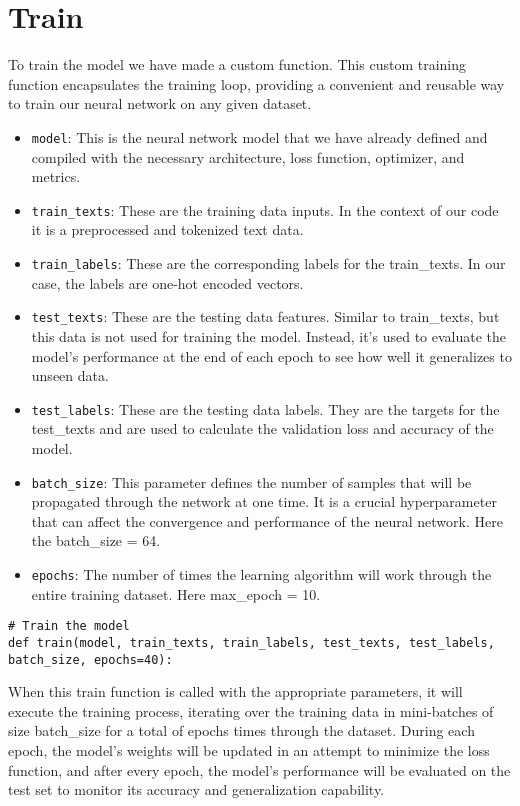 \section{Train}
To train the model we have made a custom function. This custom training function encapsulates the training loop, providing a convenient and reusable way to train our neural network on any given dataset.

\begin{itemize}
	\item \verb*|model|: This is the neural network model that we have already defined and compiled with the necessary architecture, loss function, optimizer, and metrics.
	
	\item \verb*|train_texts|: These are the training data inputs. In the context of our code it is a preprocessed and tokenized text data.
	
	\item \verb*|train_labels|: These are the corresponding labels for the train\_texts. In our case, the labels are one-hot encoded vectors.
	
	\item \verb*|test_texts|: These are the testing data features. Similar to train\_texts, but this data is not used for training the model. Instead, it's used to evaluate the model's performance at the end of each epoch to see how well it generalizes to unseen data.
	
	\item \verb*|test_labels|: These are the testing data labels. They are the targets for the test\_texts and are used to calculate the validation loss and accuracy of the model.
	
	\item \verb*|batch_size|: This parameter defines the number of samples that will be propagated through the network at one time. It is a crucial hyperparameter that can affect the convergence and performance of the neural network. Here the batch\_size = 64.
	
	\item \verb*|epochs|: The number of times the learning algorithm will work through the entire training dataset. Here max\_epoch = 10.
\end{itemize}

\begin{lstlisting}
# Train the model
def train(model, train_texts, train_labels, test_texts, test_labels, batch_size, epochs=40):
\end{lstlisting}

When this train function is called with the appropriate parameters, it will execute the training process, iterating over the training data in mini-batches of size batch\_size for a total of epochs times through the dataset. During each epoch, the model's weights will be updated in an attempt to minimize the loss function, and after every epoch, the model's performance will be evaluated on the test set to monitor its accuracy and generalization capability.